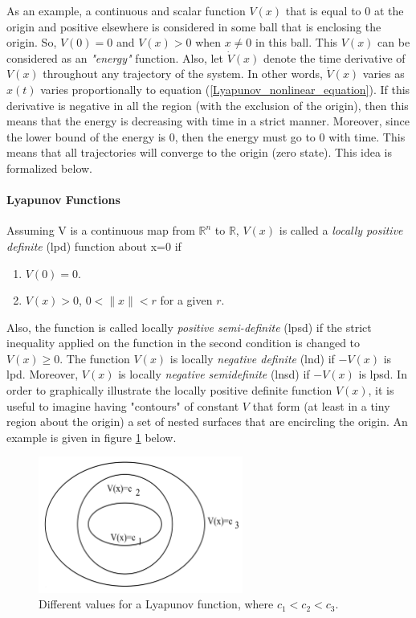 \documentclass{thesisreport}
\begin{document}
As an example, a continuous and scalar function $V(x)$ that is equal to 0 at the origin and positive elsewhere is considered in some ball that is enclosing the origin. So, $V(0)=0$ and $V(x)>0$ when $x \neq 0$ in this ball. This $V(x)$ can be considered as an \textit{"energy"} function. Also, let $\dot{V}(x)$ denote the time derivative of $V(x)$ throughout any trajectory of the system. In other words,  $\dot{V}(x)$ varies as $x(t)$ varies proportionally to equation (\ref{Lyapunov_nonlinear_equation}). If this derivative is negative in all the region (with the exclusion of the origin), then this means that the energy is decreasing with time in a strict manner. Moreover, since the lower bound of the energy is 0, then the energy must go to 0 with time. This means that all trajectories will converge to the origin (zero state). This idea is formalized below.




\newpage

\paragraph{Lyapunov Functions}

Assuming V is a continuous map from $\mathbb{R}^n$ to $\mathbb{R}$, $V(x)$ is called a \textit{locally positive definite} (lpd) function about x=0 if 

\begin{enumerate}
	\item $V(0)=0$.
	\item $V(x)>0$, $0<\|x\|<r$ for a given $r$.
\end{enumerate}

Also, the function is called locally \textit{positive semi-definite} (lpsd) if the strict inequality applied on the function in the second condition is changed to $V(x) \geq 0$. The function $V(x)$ is locally \textit{negative definite} (lnd) if $-V(x)$ is lpd. Moreover, $V(x)$ is locally \textit{negative semidefinite} (lnsd) if $-V(x)$ is lpsd. In order to graphically illustrate the locally positive definite function $V(x)$, it is useful to imagine having "contours" of constant $V$ that form (at least in a tiny region about the origin) a set of nested surfaces that are encircling the origin. An example is given in figure \ref{Lyapunov_figure} below. 


\begin{figure}[h]
\centering
\includegraphics[width=0.6\textwidth]{Images/Control/Lyapunov_function}
\caption{Different values for a Lyapunov function, where $c_1<c_2<c_3$. \cite{Dahleh2011}}
\label{Lyapunov_figure}
\end{figure}
\end{document}
